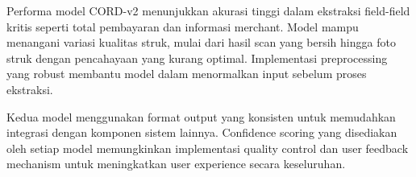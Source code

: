 Performa model CORD-v2 menunjukkan akurasi tinggi dalam ekstraksi field-field kritis seperti total pembayaran dan informasi merchant. Model mampu menangani variasi kualitas struk, mulai dari hasil scan yang bersih hingga foto struk dengan pencahayaan yang kurang optimal. Implementasi preprocessing yang robust membantu model dalam menormalkan input sebelum proses ekstraksi.

Kedua model menggunakan format output yang konsisten untuk memudahkan integrasi dengan komponen sistem lainnya. Confidence scoring yang disediakan oleh setiap model memungkinkan implementasi quality control dan user feedback mechanism untuk meningkatkan user experience secara keseluruhan.
